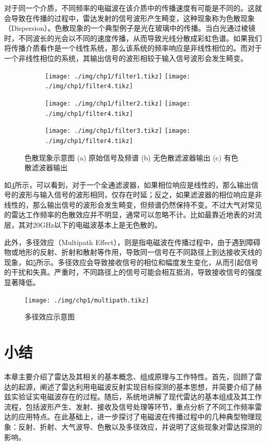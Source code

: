 对于同一个介质，不同频率的电磁波在该介质中的传播速度有可能是不同的。这就会导致在传播的过程中，雷达发射的信号波形产生畸变，这种现象称为色散现象（Dispersion）。色散现象的一个典型例子是光在玻璃中的传播。当白光通过棱镜时，不同波长的光会以不同的速度传播，从而导致光线分散成彩虹色谱。如果我们将传播介质看作是一个线性系统，那么该系统的频率响应是非线性相位的。而对于一个非线性相位的系统，其输出信号的波形相较于输入信号波形会发生畸变。
\begin{figure}[htb!]
    \centering
    \begin{subfigure}{.3\textwidth}
        \centering
        \texttt{[image: ./img/chp1/filter1.tikz]}
        \texttt{[image: ./img/chp1/filter4.tikz]}
        \caption{}
        \label{fig_chp1_filter_1}
    \end{subfigure}
    \begin{subfigure}{.3\textwidth}
        \centering
        \texttt{[image: ./img/chp1/filter2.tikz]}
        \texttt{[image: ./img/chp1/filter4.tikz]}
        \caption{}
        \label{fig_chp1_filter_2}
    \end{subfigure}
    \begin{subfigure}{.3\textwidth}
        \centering
        \texttt{[image: ./img/chp1/filter3.tikz]}
        \texttt{[image: ./img/chp1/filter4.tikz]}
        \caption{}
        \label{fig_chp1_filter_3}
    \end{subfigure}
    \caption{色散现象示意图 (a) 原始信号及频谱 (b) 无色散滤波器输出 (c) 有色散滤波器输出}
    \label{fig_chp1_filter}
\end{figure}

如\cref{fig_chp1_filter}所示，可以看到，对于一个全通滤波器，如果相位响应是线性的，那么输出信号的波形与输入信号的波形相同，仅存在时延；反之，如果滤波器的相位响应是非线性的，那么输出信号的波形会发生畸变，但频谱仍然保持不变。不过大气对常见的雷达工作频率的色散效应并不明显，通常可以忽略不计。比如最靠近地表的对流层，其对20GHz以下的电磁波基本上是无色散的。

此外，多径效应（Multipath Effect），则是指电磁波在传播过程中，由于遇到障碍物或地形的反射、折射和散射等作用，导致同一信号在不同路径上到达接收天线的现象，如\cref{fig_chp1_multipath}所示。多径效应会导致接收信号的相位和幅度发生变化，从而引起信号的干扰和失真。严重时，不同路径上的信号可能会相互抵消，导致接收信号的强度显著降低。

\begin{figure}[htb!]
    \centering
    \texttt{[image: ./img/chp1/multipath.tikz]}
    \caption{多径效应示意图}
    \label{fig_chp1_multipath}
\end{figure}

\section{小结}

本章主要介绍了雷达及其相关的基本概念、组成原理与工作特性。首先，回顾了雷达的起源，阐述了雷达利用电磁波反射实现目标探测的基本思想，并简要介绍了赫兹实验证实电磁波存在的过程。随后，系统地讲解了现代雷达的基本组成及其工作流程，包括波形产生、发射、接收及信号处理等环节，重点分析了不同工作频率雷达的应用特点。在此基础上，进一步探讨了电磁波在传播过程中的几种典型物理现象：反射、折射、大气波导、色散以及多径效应，并说明了这些现象对雷达探测的影响。

